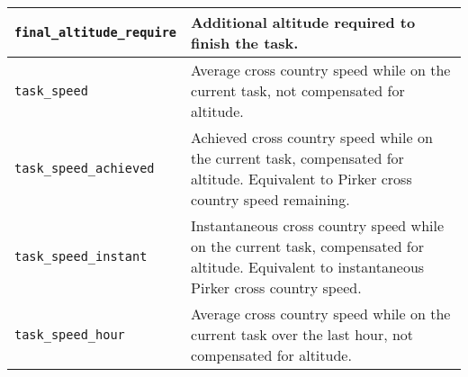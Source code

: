 \begin{maxipage}
\begin{tabularx}{1.9\textwidth}{l|X}
\hline

\verb|final_altitude_require| & Additional altitude required to finish 
the task. \\

\hline

\verb|task_speed| & Average cross country speed while on the current 
task, \newline not compensated for altitude. \\

\hline

\verb|task_speed_achieved| & Achieved cross country speed while on the 
current task, \newline compensated for altitude. Equivalent to 
Pirker cross country \newline speed remaining. \\

\hline

\verb|task_speed_instant| & Instantaneous cross country speed while 
on the current task, \newline  compensated for altitude. Equivalent 
to instantaneous Pirker cross \newline country speed. \\

\hline

\verb|task_speed_hour| & Average cross country speed while on the 
current task \newline over the last hour, not compensated for altitude. \\

\end{tabularx}
\end{maxipage}

